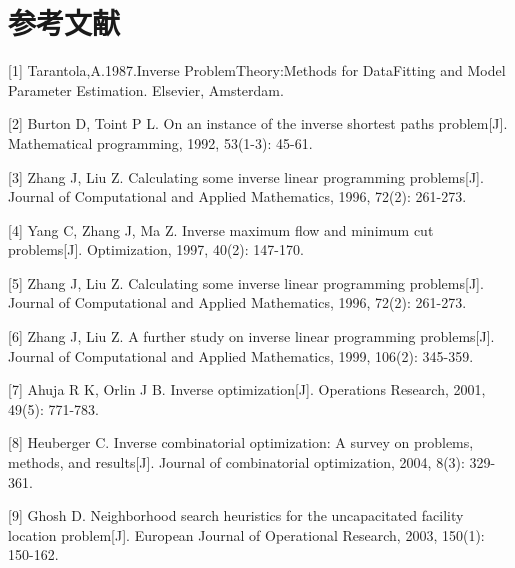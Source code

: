 \documentclass[UTF8]{article}
\begin{document}

\section*{参考文献}

[1] Tarantola,A.1987.Inverse ProblemTheory:Methods for DataFitting and Model Parameter Estimation. Elsevier, Amsterdam.

[2] Burton D, Toint P L. On an instance of the inverse shortest paths problem[J]. Mathematical programming, 1992, 53(1-3): 45-61.

[3] Zhang J, Liu Z. Calculating some inverse linear programming problems[J]. Journal of Computational and Applied Mathematics, 1996, 72(2): 261-273.

[4] Yang C, Zhang J, Ma Z. Inverse maximum flow and minimum cut problems[J]. Optimization, 1997, 40(2): 147-170.

[5] Zhang J, Liu Z. Calculating some inverse linear programming problems[J]. Journal of Computational and Applied Mathematics, 1996, 72(2): 261-273.

[6] Zhang J, Liu Z. A further study on inverse linear programming problems[J]. Journal of Computational and Applied Mathematics, 1999, 106(2): 345-359.

[7] Ahuja R K, Orlin J B. Inverse optimization[J]. Operations Research, 2001, 49(5): 771-783.

[8] Heuberger C. Inverse combinatorial optimization: A survey on problems, methods, and results[J]. Journal of combinatorial optimization, 2004, 8(3): 329-361.

[9] Ghosh D. Neighborhood search heuristics for the uncapacitated facility location problem[J]. European Journal of Operational Research, 2003, 150(1): 150-162.
\end{document}
